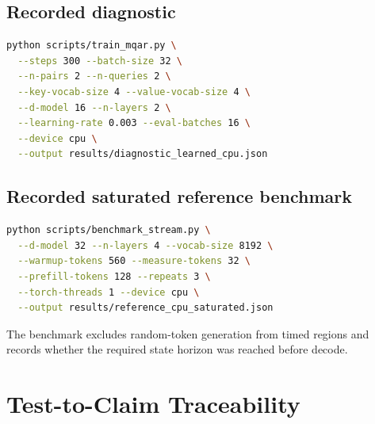 \subsection{Recorded diagnostic}

\begin{lstlisting}[language=bash]
python scripts/train_mqar.py \
  --steps 300 --batch-size 32 \
  --n-pairs 2 --n-queries 2 \
  --key-vocab-size 4 --value-vocab-size 4 \
  --d-model 16 --n-layers 2 \
  --learning-rate 0.003 --eval-batches 16 \
  --device cpu \
  --output results/diagnostic_learned_cpu.json
\end{lstlisting}

\subsection{Recorded saturated reference benchmark}

\begin{lstlisting}[language=bash]
python scripts/benchmark_stream.py \
  --d-model 32 --n-layers 4 --vocab-size 8192 \
  --warmup-tokens 560 --measure-tokens 32 \
  --prefill-tokens 128 --repeats 3 \
  --torch-threads 1 --device cpu \
  --output results/reference_cpu_saturated.json
\end{lstlisting}

The benchmark excludes random-token generation from timed regions and records
whether the required state horizon was reached before decode.

\section{Test-to-Claim Traceability}
\label{app:test-trace}

